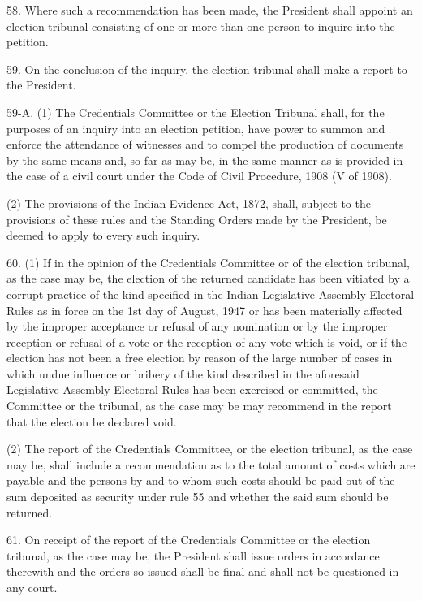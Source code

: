 58. Where such a recommendation has been made, the President shall appoint an election tribunal consisting of one or more than one person to inquire into the petition. 



59. On the conclusion of the inquiry, the election tribunal shall make a report to the President.



59-A. (1) The Credentials Committee or the Election Tribunal shall, for the purposes of an inquiry into an election petition, have power to summon and enforce the attendance of witnesses and to compel the production of documents by the same means and, so far as may be, in the same manner as is provided in the case of a civil court under the Code of Civil Procedure, 1908 (V of 1908).



(2) The provisions of the Indian Evidence Act, 1872, shall, subject to the provisions of these rules and the Standing Orders made by the President, be deemed to apply to every such inquiry.



60. (1) If in the opinion of the Credentials Committee or of the election tribunal, as the case may be, the election of the returned candidate has been vitiated by a corrupt practice of the kind specified in the Indian Legislative Assembly Electoral Rules as in force on the 1st day of August, 1947 or has been materially affected by the improper acceptance or refusal of any nomination or by the improper reception or refusal of a vote or the reception of any vote which is void, or if the election has not been a free election by reason of the large number of cases in which undue influence or bribery of the kind described in the aforesaid Legislative Assembly Electoral Rules has been exercised or committed, the Committee or the tribunal, as the case may be may recommend in the report that the election be declared void.



(2) The report of the Credentials Committee, or the election tribunal, as the case may be, shall include a recommendation as to the total amount of costs which are payable and the persons by and to whom such costs should be paid out of the sum deposited as security under rule 55 and whether the said sum should be returned.



61. On receipt of the report of the Credentials Committee or the election tribunal, as the case may be, the President shall issue orders in accordance therewith and the orders so issued shall be final and shall not be questioned in any court.



